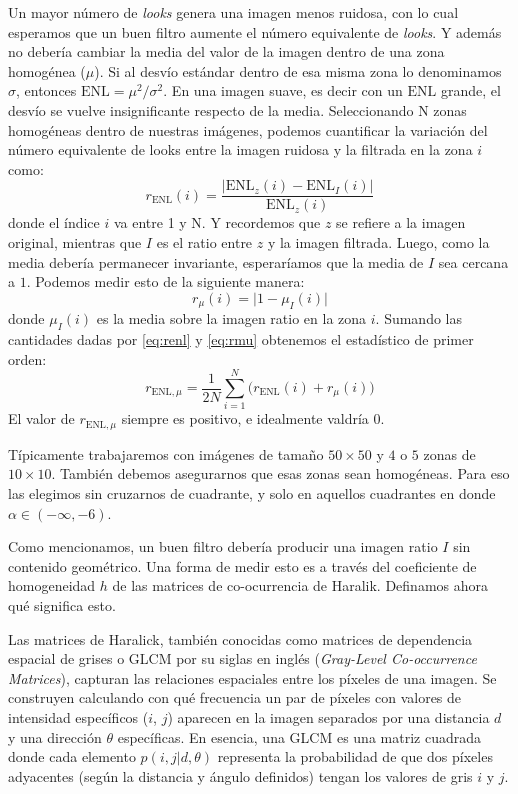 Un mayor número de \emph{looks} genera una imagen menos ruidosa, con lo cual esperamos que un buen filtro aumente el número equivalente de \emph{looks}. Y además no debería cambiar la media del valor de la imagen dentro de una zona homogénea ($\mu$). Si al desvío estándar dentro de esa misma zona lo denominamos $\sigma$, entonces $\text{ENL} = \mu^2 / \sigma^2$. En una imagen suave, es decir con un $\text{ENL}$ grande, el desvío se vuelve insignificante respecto de la media. Seleccionando N zonas homogéneas dentro de nuestras imágenes, podemos cuantificar la variación del número equivalente de looks entre la imagen ruidosa y la filtrada en la zona $i$ como:
\begin{equation}\label{eq:renl}
    r_{\text{ENL}}(i) = \frac{\big|\text{ENL}_z(i) - \text{ENL}_I(i)\big|}{\text{ENL}_z(i)}
\end{equation}
donde el índice $i$ va entre 1 y N. Y recordemos que $z$ se refiere a la imagen original, mientras que $I$ es el ratio entre $z$ y la imagen filtrada. Luego, como la media debería permanecer invariante, esperaríamos que la media de $I$ sea cercana a $1$. Podemos medir esto de la siguiente manera:
\begin{equation}\label{eq:rmu}
    r_{\mu}(i) = \big|1-\mu_I(i)\big|
\end{equation}
donde $\mu_I(i)$ es la media sobre la imagen ratio en la zona $i$. Sumando las cantidades dadas por \ref{eq:renl} y \ref{eq:rmu} obtenemos el estadístico de primer orden:
\begin{equation}
    r_{\text{ENL},\mu} = \frac{1}{2N}\sum_{i=1}^{N} \big( r_{\text{ENL}}(i) + r_{\mu}(i) \big)
\end{equation}
El valor de $r_{\text{ENL},\mu}$ siempre es positivo, e idealmente valdría $0$.

Típicamente trabajaremos con imágenes de tamaño $50\times 50$ y $4$ o $5$ zonas de $10\times 10$. También debemos asegurarnos que esas zonas sean homogéneas. Para eso las elegimos sin cruzarnos de cuadrante, y solo en aquellos cuadrantes en donde $\alpha\in(-\infty,-6)$.

Como mencionamos, un buen filtro debería producir una imagen ratio $I$ sin contenido geométrico. Una forma de medir esto es a través del coeficiente de homogeneidad $h$ de las matrices de co-ocurrencia de Haralik. Definamos ahora qué significa esto.

Las matrices de Haralick, también conocidas como matrices de dependencia espacial de grises o GLCM por su siglas en inglés (\emph{Gray-Level Co-occurrence Matrices}), capturan las relaciones espaciales entre los píxeles de una imagen. Se construyen calculando con qué frecuencia un par de píxeles con valores de intensidad específicos ($i$, $j$) aparecen en la imagen separados por una distancia $d$ y una dirección $\theta$ específicas. En esencia, una GLCM es una matriz cuadrada donde cada elemento $p(i, j | d, \theta)$ representa la probabilidad de que dos píxeles adyacentes (según la distancia y ángulo definidos) tengan los valores de gris $i$ y $j$.

